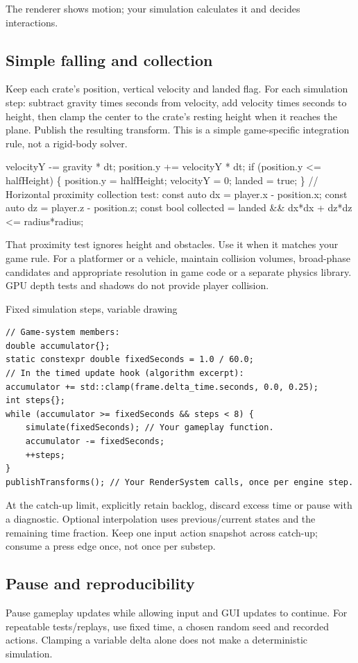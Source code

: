 \documentclass[11pt,a4paper]{article}
\begin{document}
\label{core-66}
The renderer shows motion; your simulation calculates it and decides interactions.

\subsection*{Simple falling and collection}
Keep each crate's position, vertical velocity and landed flag. For each simulation step: subtract gravity times seconds from velocity, add velocity times seconds to height, then clamp the center to the crate's resting height when it reaches the plane. Publish the resulting transform. This is a simple game-specific integration rule, not a rigid-body solver.

velocityY -= gravity * dt; position.y += velocityY * dt; if (position.y <= halfHeight) \{ position.y = halfHeight; velocityY = 0; landed = true; \} // Horizontal proximity collection test: const auto dx = player.x - position.x; const auto dz = player.z - position.z; const bool collected = landed \&\& dx*dx + dz*dz <= radius*radius;

That proximity test ignores height and obstacles. Use it when it matches your game rule. For a platformer or a vehicle, maintain collision volumes, broad-phase candidates and appropriate resolution in game code or a separate physics library. GPU depth tests and shadows do not provide player collision.

Fixed simulation steps, variable drawing

\begin{lstlisting}[language={}]
// Game-system members:
double accumulator{};
static constexpr double fixedSeconds = 1.0 / 60.0;
// In the timed update hook (algorithm excerpt):
accumulator += std::clamp(frame.delta_time.seconds, 0.0, 0.25);
int steps{};
while (accumulator >= fixedSeconds && steps < 8) {
    simulate(fixedSeconds); // Your gameplay function.
    accumulator -= fixedSeconds;
    ++steps;
}
publishTransforms(); // Your RenderSystem calls, once per engine step.
\end{lstlisting}

At the catch-up limit, explicitly retain backlog, discard excess time or pause with a diagnostic. Optional interpolation uses previous/current states and the remaining time fraction. Keep one input action snapshot across catch-up; consume a press edge once, not once per substep.

\subsection*{Pause and reproducibility}
Pause gameplay updates while allowing input and GUI updates to continue. For repeatable tests/replays, use fixed time, a chosen random seed and recorded actions. Clamping a variable delta alone does not make a deterministic simulation.
\end{document}
